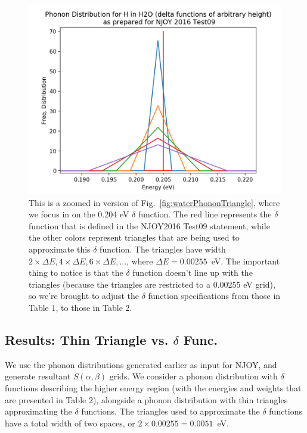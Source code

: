 \documentclass[10pt]{article}
\begin{document}
\begin{multicols}{2}
            \begin{figure}[H]
              \begin{center}
              \includegraphics[scale=0.5]{waterPhononDistTrianglesZoomed}
                \caption{This is a zoomed in version of Fig.~\ref{fig:waterPhononTriangle}, where we focus in on the 0.204 eV $\delta$ function. The red line represents the $\delta$ function that is defined in the NJOY2016 Test09 statement, while the other colors represent triangles that are being used to approximate this $\delta$ function. The triangles have width $2\times\Delta E,4\times\Delta E,6\times\Delta E,...$, where $\Delta E=0.00255$~eV. The important thing to notice is that the $\delta$ function doesn't line up with the triangles (because the triangles are restricted to a 0.00255 eV grid), so we're brought to adjust the $\delta$ function specifications from those in Table 1, to those in Table 2.}
              
              \label{fig:waterPhononTriangleZoomed}
              \end{center}
            \end{figure}


\subsection*{Results: Thin Triangle vs. $\delta$ Func.}
We use the phonon distributions generated earlier as input for NJOY, and generate resultant $S(\alpha,\beta)$ grids. We consider a phonon distribution with $\delta$ functions describing the higher energy region (with the energies and weights that are presented in Table 2), alongside a phonon distribution with thin triangles approximating the $\delta$ functions. The triangles used to approximate the $\delta$ functions have a total width of two spaces, or $2\times0.00255=0.0051$~eV.


\end{multicols}
\end{document}
